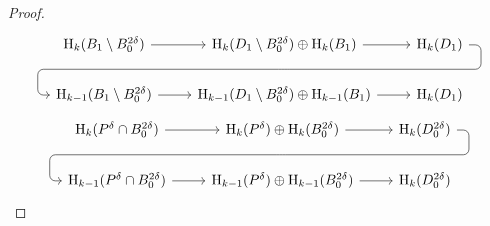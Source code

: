 \begin{proof}
\begin{equation}\begin{tikzcd}
    \hom_k(B_1\setminus B_0^{2\delta})\arrow[r] &
    \hom_k(D_1\setminus B_0^{2\delta})\oplus\hom_k(B_1)\arrow[r]
        \arrow[d, phantom, ""{coordinate, name=Z}] &
    \hom_k(D_1)\arrow[dll, "", rounded corners,
              to path={ -- ([xshift=2ex]\tikztostart.east)
                        |- (Z) [near end]\tikztonodes
                        -| ([xshift=-2ex]\tikztotarget.west)
                        -- (\tikztotarget)}] \\
    \hom_{k-1}(B_1\setminus B_0^{2\delta})\arrow[r] &
    \hom_{k-1}(D_1\setminus B_0^{2\delta})\oplus\hom_{k-1}(B_1)\arrow[r] &
    \hom_k(D_1)
\end{tikzcd}\end{equation}
\begin{equation}\begin{tikzcd}
    \hom_k(P^\delta \cap B_0^{2\delta})\arrow[r] &
    \hom_k(P^\delta)\oplus\hom_k(B_0^{2\delta})\arrow[r]
        \arrow[d, phantom, ""{coordinate, name=Z}] &
    \hom_k(D_0^{2\delta})\arrow[dll, "", rounded corners,
              to path={ -- ([xshift=2ex]\tikztostart.east)
                        |- (Z) [near end]\tikztonodes
                        -| ([xshift=-2ex]\tikztotarget.west)
                        -- (\tikztotarget)}] \\
    \hom_{k-1}(P^\delta \cap B_0^{2\delta})\arrow[r] &
    \hom_{k-1}(P^\delta)\oplus\hom_{k-1}(B_0^{2\delta})\arrow[r] &
    \hom_k(D_0^{2\delta})
\end{tikzcd}\end{equation}


\end{proof}
